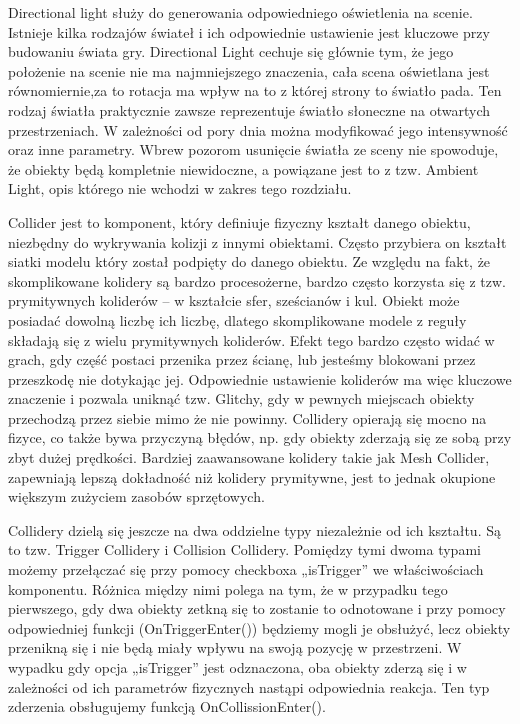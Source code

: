 \documentclass[brudnopis]{xmgr}
\begin{document}
Directional light służy do generowania odpowiedniego oświetlenia na scenie. Istnieje kilka rodzajów świateł i ich odpowiednie ustawienie jest kluczowe przy budowaniu świata gry. Directional Light cechuje się głównie tym, że jego położenie na scenie nie ma najmniejszego znaczenia, cała scena oświetlana jest równomiernie,za to rotacja ma wpływ na to z której strony to światło pada. Ten rodzaj światła praktycznie zawsze reprezentuje światło słoneczne na otwartych przestrzeniach. W zależności od pory dnia można modyfikować jego intensywność oraz inne parametry. Wbrew pozorom usunięcie światła ze sceny nie spowoduje, że obiekty będą kompletnie niewidoczne, a powiązane jest to z tzw. Ambient Light, opis którego nie wchodzi w zakres tego rozdziału.

Collider jest to komponent, który definiuje fizyczny kształt danego obiektu, niezbędny do wykrywania kolizji z innymi obiektami. Często przybiera on kształt siatki modelu który został podpięty do danego obiektu. Ze względu na fakt, że skomplikowane kolidery są bardzo procesożerne, bardzo często korzysta się z tzw. prymitywnych koliderów – w kształcie sfer, sześcianów i kul. Obiekt może posiadać dowolną liczbę ich liczbę, dlatego skomplikowane modele z reguły składają się z wielu prymitywnych koliderów. Efekt tego bardzo często widać w grach, gdy część postaci przenika przez ścianę, lub jesteśmy blokowani przez przeszkodę nie dotykając jej. Odpowiednie ustawienie koliderów ma więc kluczowe znaczenie i pozwala uniknąć tzw. Glitchy, gdy w pewnych miejscach obiekty przechodzą przez siebie mimo że nie powinny. Collidery opierają się mocno na fizyce, co także bywa przyczyną błędów, np. gdy obiekty zderzają się ze sobą przy zbyt dużej prędkości. Bardziej zaawansowane kolidery takie jak Mesh Collider, zapewniają lepszą dokładność niż kolidery prymitywne, jest to jednak okupione większym zużyciem zasobów sprzętowych. 

Collidery dzielą się jeszcze na dwa  oddzielne typy niezależnie od ich kształtu. Są to tzw. Trigger Collidery i Collision Collidery. Pomiędzy tymi dwoma typami możemy przełączać się przy pomocy checkboxa „isTrigger” we właściwościach komponentu. Różnica między nimi polega na tym, że w przypadku tego pierwszego, gdy dwa obiekty zetkną się to zostanie to odnotowane i przy pomocy odpowiedniej funkcji (OnTriggerEnter()) będziemy mogli je obsłużyć, lecz obiekty przenikną się i nie będą miały wpływu na swoją pozycję w przestrzeni. W wypadku gdy opcja „isTrigger” jest odznaczona, oba obiekty zderzą się i w zależności od ich parametrów fizycznych nastąpi odpowiednia reakcja. Ten typ zderzenia obsługujemy funkcją OnCollissionEnter().
\end{document}
